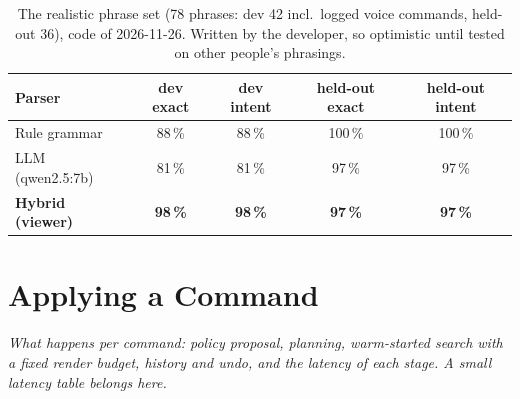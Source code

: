 \documentclass[12pt, a4paper]{book}
\newcommand{\plan}[1]{{\color{gray}\itshape #1\par}}
\begin{document}
\begin{table}[ht]
  \centering
  \small
  \caption[Parser accuracy on realistic phrasings]{The realistic phrase set (78 phrases: dev 42 incl.\ logged voice commands, held-out 36), code of 2026-11-26. Written by the developer, so optimistic until tested on other people's phrasings.}
  \label{tab:sys-parser-realistic}
  \begin{tabular}{lcccc}
    \toprule
    Parser & dev exact & dev intent & held-out exact & held-out intent \\
    \midrule
    Rule grammar & 88\,\% & 88\,\% & 100\,\% & 100\,\% \\
    LLM (qwen2.5:7b) & 81\,\% & 81\,\% & 97\,\% & 97\,\% \\
    \textbf{Hybrid (viewer)} & \textbf{98\,\%} & \textbf{98\,\%} & \textbf{97\,\%} & \textbf{97\,\%} \\
    \bottomrule
  \end{tabular}
\end{table}

\section{Applying a Command}
\label{sec:sys-apply}
\plan{What happens per command: policy proposal, planning, warm-started search with a fixed render budget, history and undo, and the latency of each stage. A small latency table belongs here.}
\end{document}

